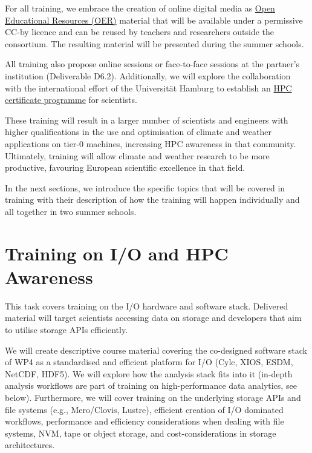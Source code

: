 For all training, we embrace the creation of online digital media as \href{https://www.oercommons.org}{Open Educational Resources (OER)} material that will be available under a permissive CC-by licence and can be reused by teachers and researchers outside the consortium. The resulting material will be presented during the summer schools.

All training also propose online sessions or face-to-face sessions at the partner's institution (Deliverable D6.2). Additionally, we will explore the collaboration with the international effort of the Universität Hamburg to establish an \href{https://www.hhcc.uni- hamburg.de/en/hpc-certification-program.html}{HPC certificate programme} for scientists.

These training will result in a larger number of scientists and engineers with higher qualifications in the use and optimisation of climate and weather applications on tier-0 machines, increasing HPC awareness in that community. Ultimately, training will allow climate and weather research to be more productive, favouring European scientific excellence in that field.

In the next sections, we introduce the specific topics that will be covered in training with their description of how the training will happen individually and all together in two summer schools.

\section{Training on I/O and HPC Awareness}
\label{sec:tio}

This task covers training on the I/O hardware and software stack. Delivered material will target scientists accessing data on storage and developers that aim to utilise storage APIs efficiently.

We will create descriptive course material covering the co-designed software stack of WP4 as a standardised and efficient platform for I/O (Cylc, XIOS, ESDM, NetCDF, HDF5). We will explore how the analysis stack fits into it (in-depth analysis workflows are part of training on high-performance data analytics, see below). Furthermore, we will cover training on the underlying storage APIs and file systems (e.g., Mero/Clovis, Lustre), efficient creation of I/O dominated workflows, performance and efficiency considerations when dealing with file systems, NVM, tape or object storage, and cost-considerations in storage architectures.


